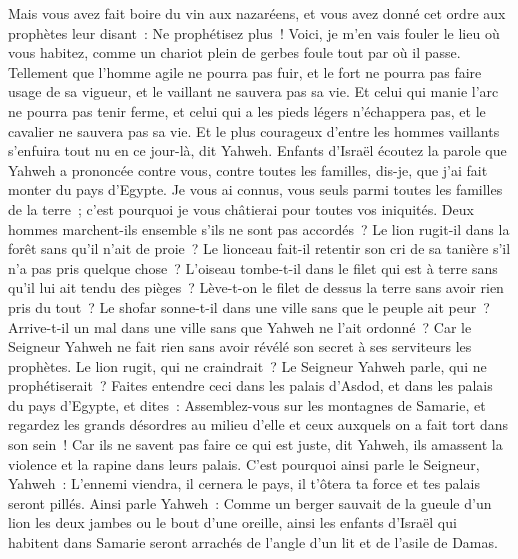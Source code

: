 \begin{multicols}{2}
Mais vous avez fait boire du vin aux nazaréens, et vous avez donné cet ordre aux prophètes leur disant~: Ne prophétisez plus~!
Voici, je m'en vais fouler le lieu où vous habitez, comme un chariot plein de gerbes foule tout par où il passe.
Tellement que l'homme agile ne pourra pas fuir, et le fort ne pourra pas faire usage de sa vigueur, et le vaillant ne sauvera pas sa vie.
Et celui qui manie l'arc ne pourra pas tenir ferme, et celui qui a les pieds légers n'échappera pas, et le cavalier ne sauvera pas sa vie.
Et le plus courageux d'entre les hommes vaillants s'enfuira tout nu en ce jour-là, dit Yahweh.
\VerseOne{}Enfants d'Israël écoutez la parole que Yahweh a prononcée contre vous, contre toutes les familles, dis-je, que j'ai fait monter du pays d'Egypte.
Je vous ai connus, vous seuls parmi toutes les familles de la terre~; c'est pourquoi je vous châtierai pour toutes vos iniquités.
Deux hommes marchent-ils ensemble s'ils ne sont pas accordés~?
Le lion rugit-il dans la forêt sans qu'il n'ait de proie~? Le lionceau fait-il retentir son cri de sa tanière s'il n'a pas pris quelque chose~?
L'oiseau tombe-t-il dans le filet qui est à terre sans qu'il lui ait tendu des pièges~? Lève-t-on le filet de dessus la terre sans avoir rien pris du tout~?
Le shofar sonne-t-il dans une ville sans que le peuple ait peur~? Arrive-t-il un mal dans une ville sans que Yahweh ne l'ait ordonné~?
Car le Seigneur Yahweh ne fait rien sans avoir révélé son secret à ses serviteurs les prophètes. 
Le lion rugit, qui ne craindrait~? Le Seigneur Yahweh parle, qui ne prophétiserait~?
Faites entendre ceci dans les palais d'Asdod, et dans les palais du pays d'Egypte, et dites~: Assemblez-vous sur les montagnes de Samarie, et regardez les grands désordres au milieu d'elle et ceux auxquels on a fait tort dans son sein~!
Car ils ne savent pas faire ce qui est juste, dit Yahweh, ils amassent la violence et la rapine dans leurs palais.
C'est pourquoi ainsi parle le Seigneur, Yahweh~: L'ennemi viendra, il cernera le pays, il t'ôtera ta force et tes palais seront pillés.
Ainsi parle Yahweh~: Comme un berger sauvait de la gueule d'un lion les deux jambes ou le bout d'une oreille, ainsi les enfants d'Israël qui habitent dans Samarie seront arrachés de l'angle d'un lit et de l'asile de Damas.

\end{multicols}
